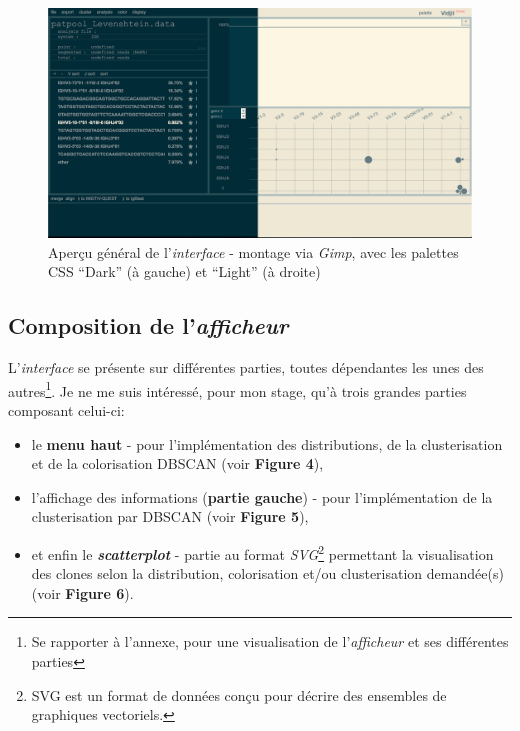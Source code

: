 \documentclass[pdftex,12pt,a4paper]{report}
\begin{document}
\begin{spacing}{1.2}
\begin{figure}[H]
\begin{center}
	\includegraphics[scale=0.35]{img/Montage_Sans_Annotations.jpg}
\end{center}
\caption{Aperçu général de l'\textit{interface} - montage via \textit{Gimp}, avec les palettes CSS ``Dark'' (à gauche) et ``Light'' (à droite)}
\end{figure}

\subsection{Composition de l'\textit{afficheur}}

L'\textit{interface} se présente sur différentes parties, toutes dépendantes les unes des autres\footnote{Se rapporter à l'annexe, pour une visualisation de l'\textit{afficheur} et ses différentes parties}.
\newline Je ne me suis intéressé, pour mon stage, qu'à trois grandes parties composant celui-ci:
\begin{itemize}
\item{le \textbf{menu haut} - pour l'implémentation des distributions, de la clusterisation et de la colorisation DBSCAN (voir \textbf{Figure 4}),}
\item{l'affichage des informations (\textbf{partie gauche}) - pour l'implémentation de la clusterisation par DBSCAN (voir \textbf{Figure 5}),}
\item{et enfin le \textbf{\textit{scatterplot}} - partie au format \textit{SVG}\footnote{SVG est un format de données conçu pour décrire des ensembles de graphiques vectoriels.} permettant la visualisation des clones selon la distribution, colorisation et/ou clusterisation demandée(s) (voir \textbf{Figure 6}).}
\end{itemize}


\end{spacing}
\end{document}
